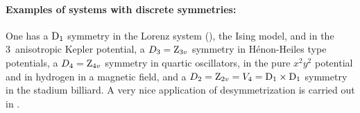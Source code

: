 



\paragraph{Examples of systems with discrete symmetries:}
One has
a $\mathrm{D}_1$ symmetry in the Lorenz system (), %
the Ising model,
and in the 3\dmn\ anisotropic Kepler
potential,
a $D_3=\mathrm{Z}_{3v}$ symmetry in H\'enon-Heiles type potentials,
a $D_4=\mathrm{Z}_{4v}$ symmetry in quartic oscillators,
in the pure $x^2 y^2$ potential and
in hydrogen in a magnetic field,
and a $D_2=\mathrm{Z}_{2v} = V_4 =\mathrm{D}_1\times \mathrm{D}_1$ symmetry
in the stadium billiard.
A very nice application of desymmetrization is
carried out in .

